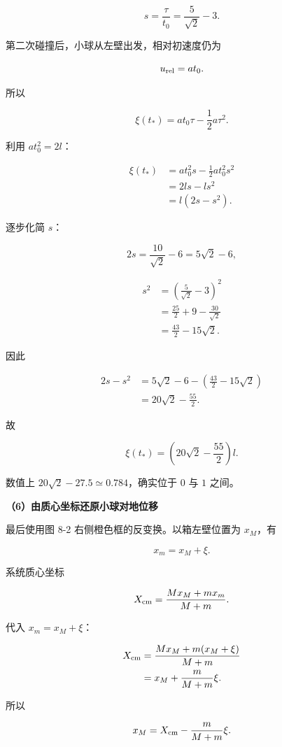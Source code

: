 \documentclass[12pt,a4paper,UTF8]{ctexart}
\begin{document}
\[
s=\frac{\tau}{t_0}=\frac5{\sqrt2}-3.
\]

第二次碰撞后，小球从左壁出发，相对初速度仍为

\[u_{\rm rel}=at_0.\]

所以

\[
\xi(t_*)=at_0\tau-\frac12a\tau^2.
\]

利用 \(at_0^2=2l\)：

\[
\begin{aligned}
\xi(t_*)
&=at_0^2s-\frac12at_0^2s^2\\
&=2ls-ls^2\\
&=l(2s-s^2).
\end{aligned}
\]

逐步化简 \(s\)：

\[
2s=\frac{10}{\sqrt2}-6=5\sqrt2-6,
\]

\[
\begin{aligned}
s^2
&=\left(\frac5{\sqrt2}-3\right)^2\\
&=\frac{25}{2}+9-\frac{30}{\sqrt2}\\
&=\frac{43}{2}-15\sqrt2.
\end{aligned}
\]

因此

\[
\begin{aligned}
2s-s^2
&=5\sqrt2-6-\left(\frac{43}{2}-15\sqrt2\right)\\
&=20\sqrt2-\frac{55}{2}.
\end{aligned}
\]

故

\[
\boxed{
\xi(t_*)=\left(20\sqrt2-\frac{55}{2}\right)l
}.
\]

数值上 \(20\sqrt2-27.5\simeq0.784\)，确实位于 \(0\) 与 \(1\) 之间。

\textbf{（6）由质心坐标还原小球对地位移}

最后使用图 8-2 右侧橙色框的反变换。以箱左壁位置为 \(x_M\)，有

\[x_m=x_M+\xi.\]

系统质心坐标

\[
X_{\rm cm}=\frac{Mx_M+mx_m}{M+m}.
\]

代入 \(x_m=x_M+\xi\)：

\[
\begin{aligned}
X_{\rm cm}
&=\frac{Mx_M+m(x_M+\xi)}{M+m}\\
&=x_M+\frac{m}{M+m}\xi.
\end{aligned}
\]

所以

\[x_M=X_{\rm cm}-\frac{m}{M+m}\xi.\]
\end{document}
